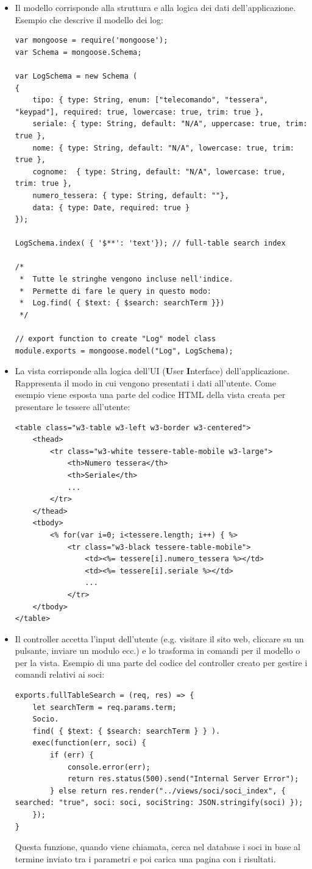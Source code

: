 \documentclass[12pt]{report}
\begin{document}
\begin{itemize}
	\item Il modello corrisponde alla struttura e alla logica dei dati dell'applicazione. Esempio che descrive il modello dei log:
\begin{lstlisting}
var mongoose = require('mongoose');
var Schema = mongoose.Schema;

var LogSchema = new Schema (
{
	tipo: { type: String, enum: ["telecomando", "tessera", "keypad"], required: true, lowercase: true, trim: true },
	seriale: { type: String, default: "N/A", uppercase: true, trim: true },
	nome: { type: String, default: "N/A", lowercase: true, trim: true },
	cognome:  { type: String, default: "N/A", lowercase: true, trim: true },
	numero_tessera: { type: String, default: ""},
	data: { type: Date, required: true }
});

LogSchema.index( { '$**': 'text'}); // full-table search index

/* 
 *	Tutte le stringhe vengono incluse nell'indice.
 *	Permette di fare le query in questo modo: 
 *	Log.find( { $text: { $search: searchTerm }}) 
 */

// export function to create "Log" model class
module.exports = mongoose.model("Log", LogSchema);
\end{lstlisting}
	\item La vista corrisponde alla logica dell'UI (\textbf{U}ser \textbf{I}nterface) dell'applicazione. Rappresenta il modo in cui vengono presentati i dati all'utente. Come esempio viene esposta una parte del codice HTML della vista creata per presentare le tessere all'utente:
\begin{lstlisting}
<table class="w3-table w3-left w3-border w3-centered">
	<thead>
		<tr class="w3-white tessere-table-mobile w3-large">
			<th>Numero tessera</th>
			<th>Seriale</th>
			...
		</tr>
	</thead>
	<tbody>
		<% for(var i=0; i<tessere.length; i++) { %>
			<tr class="w3-black tessere-table-mobile">
				<td><%= tessere[i].numero_tessera %></td>
				<td><%= tessere[i].seriale %></td>
				...
			</tr>
	</tbody>
</table>
\end{lstlisting}
	\item Il controller accetta l'input dell'utente (e.g. visitare il sito web, cliccare su un pulsante, inviare un modulo ecc.) e lo trasforma in comandi per il modello o per la vista. Esempio di una parte del codice del controller creato per gestire i comandi relativi ai soci:
\begin{lstlisting}
exports.fullTableSearch = (req, res) => {
	let searchTerm = req.params.term;
	Socio.
	find( { $text: { $search: searchTerm } } ).
	exec(function(err, soci) {
		if (err) {
			console.error(err);
			return res.status(500).send("Internal Server Error");
		} else return res.render("../views/soci/soci_index", { searched: "true", soci: soci, sociString: JSON.stringify(soci) });
	});
}
\end{lstlisting}
	 Questa funzione, quando viene chiamata, cerca nel database i soci in base al termine inviato tra i parametri e poi carica una pagina con i risultati.
\end{itemize}
\end{document}
